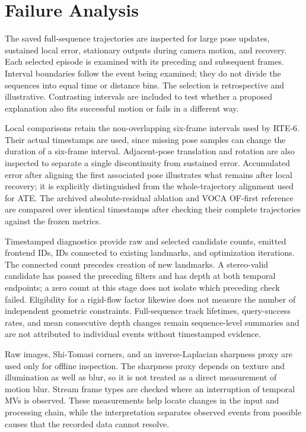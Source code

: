 \section{Failure Analysis}

The saved full-sequence trajectories are inspected for large pose updates,
sustained local error, stationary outputs during camera motion, and recovery.
Each selected episode is examined with its preceding and subsequent frames.
Interval boundaries follow the event being examined; they do not divide the
sequences into equal time or distance bins. The selection is retrospective and
illustrative. Contrasting intervals are included to test whether a proposed
explanation also fits successful motion or fails in a different way.

Local comparisons retain the non-overlapping six-frame intervals used by RTE-6.
Their actual timestamps are used, since missing pose samples can change the
duration of a six-frame interval. Adjacent-pose translation and rotation are
also inspected to separate a single discontinuity from sustained error.
Accumulated error after aligning the first associated pose illustrates what
remains after local recovery; it is explicitly distinguished from the
whole-trajectory alignment used for ATE. The archived absolute-residual
ablation and VOCA OF-first reference are compared over identical timestamps
after checking their complete trajectories against the frozen metrics.

Timestamped diagnostics provide raw and selected candidate counts, emitted
frontend IDs, IDs connected to existing landmarks, and optimization iterations.
The connected count precedes creation of new landmarks. A stereo-valid
candidate has passed the preceding filters and has depth at both temporal
endpoints; a zero count at this stage does not isolate which preceding check
failed. Eligibility for a rigid-flow factor likewise does not measure the
number of independent geometric constraints. Full-sequence track lifetimes,
query-success rates, and mean consecutive depth changes remain sequence-level
summaries and are not attributed to individual events without timestamped
evidence.

Raw images, Shi-Tomasi corners, and an inverse-Laplacian sharpness proxy are
used only for offline inspection. The sharpness proxy depends on texture and
illumination as well as blur, so it is not treated as a direct measurement of
motion blur. Stream frame types are checked where an interruption of temporal
MVs is observed. These measurements help locate changes in the input and
processing chain, while the interpretation separates observed events from
possible causes that the recorded data cannot resolve.

